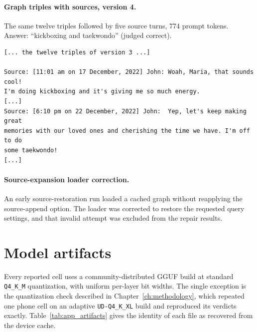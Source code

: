 \paragraph{Graph triples with sources, version 4.} The same twelve triples followed by five source
turns, 774 prompt tokens. Answer: ``kickboxing and taekwondo'' (judged correct).

\begin{small}
\begin{verbatim}
[... the twelve triples of version 3 ...]

Source: [11:01 am on 17 December, 2022] John: Woah, Maria, that sounds cool!
I'm doing kickboxing and it's giving me so much energy.
[...]
Source: [6:10 pm on 22 December, 2022] John:  Yep, let's keep making great
memories with our loved ones and cherishing the time we have. I'm off to do
some taekwondo!
[...]
\end{verbatim}
\end{small}

\paragraph{Source-expansion loader correction.}
\label{app:repro_graph_loader}
An early source-restoration run loaded a cached graph without reapplying the source-append
option. The loader was corrected to restore the requested query settings, and that invalid
attempt was excluded from the repair results.

\section{Model artifacts}
\label{app:repro_models}

Every reported cell uses a community-distributed GGUF build at standard
\texttt{Q4\_K\_M} quantization, with uniform per-layer bit widths. The single exception is the
quantization check described in Chapter~\ref{ch:methodology}, which repeated one phone cell on
an adaptive \texttt{UD-Q4\_K\_XL} build and reproduced its verdicts exactly.
Table~\ref{tab:app_artifacts} gives the identity of each file as recovered from the device
cache.

